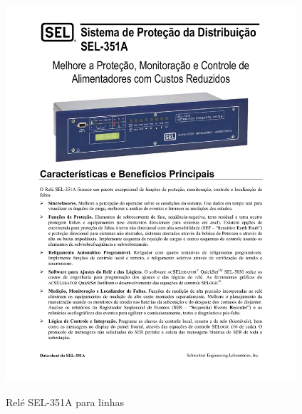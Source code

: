\documentclass[a5paper,english,spanish,brazil]{ufsc-thesis}
\begin{document}
		\begin{figure}[htb]
		  \caption{Relé SEL-351A para linhas}
		  \centering
		  \includegraphics[width=10.8cm]{sel.pdf}
		  \label{fig:rele}
		\end{figure}
\end{document}
